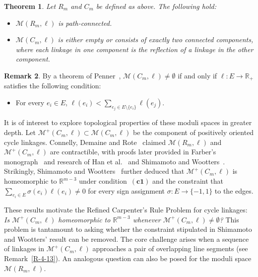 \documentclass[11pt,letterpaper]{amsart}
\theoremstyle{plain}
\newtheorem{theorem}{Theorem}[section]
\theoremstyle{definition}
\newtheorem{remark}[theorem]{Remark}
\theoremstyle{remark}
\numberwithin{equation}{section}
\begin{document}
\begin{theorem}\label{T-1-1} Let $R_m$ and $C_m$ be defined as above. The following hold:
\begin{itemize}
\item[$(i)$] $\mathcal M(R_m,\ell)$ is path-connected.
\item[$(ii)$] $\mathcal M(C_m,\ell)$ is either empty or consists of exactly two connected components, where each linkage in one component is the reflection of a linkage in the other component.
\end{itemize}
\end{theorem}

\begin{remark}\label{R-1-2}
By a theorem of Penner~\cite[Theorem 6.2]{Penner-1987}, $\mathcal M(C_m,\ell)\neq \emptyset$ if and only if $\ell:E\to \mathbb R_{+}$ satisfies the following condition:
\begin{itemize}
\item[$\mathrm{\mathbf{(c1)}}$]For every $e_i\in E$, $\ell(e_i)<\sum_{e_j\in E\setminus\{e_i\}} \ell(e_j)$.
\end{itemize}
\end{remark}

It is of interest to explore topological properties of these moduli spaces in greater depth. Let $\mathcal M^{+}(C_m,\ell)\subset \mathcal M(C_m,\ell)$ be the component of positively oriented cycle linkages. Connelly, Demaine and Rote~\cite{Connelly-2003} claimed $\mathcal M(R_m,\ell)$ and $\mathcal M^{+}(C_m,\ell)$ are contractible, with proofs later provided in Farber's monograph~\cite{Farber-2008} and research of Han et al.~\cite{Han-2013} and Shimamoto and Wootters~\cite{Shimamoto-2014}. Strikingly, Shimamoto and Wootters~\cite{Shimamoto-2014} further deduced that $\mathcal M^{+}(C_m,\ell)$ is homeomorphic to $\mathbb R^{m-3}$
under condition~$\mathrm{\mathbf{(c1)}}$ and the constraint that $\sum_{e_i\in E}\sigma(e_i)\ell(e_i)\neq0$ for every sign assignment $\sigma: E\to\{-1,1\}$ to the edges.


These results motivate the Refined Carpenter's Rule Problem for cycle linkages: \emph{Is $\mathcal M^{+}(C_m,\ell)$ homeomorphic to $\mathbb R^{m-3}$ whenever $\mathcal M^{+}(C_m,\ell)\neq \emptyset$?} This problem is tantamount to asking whether the constraint stipulated in Shimamoto and Wootters' result can be removed. The core challenge arises when a sequence of linkages in $\mathcal M^{+}(C_m,\ell)$ approaches a pair of overlapping line segments (see Remark~\ref{R-4-13}).
An analogous question can also be posed for the moduli space $\mathcal M(R_m,\ell)$.
\end{document}
